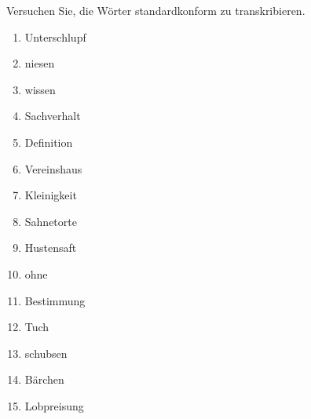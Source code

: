 \Uebung \label{u33} Versuchen Sie, die Wörter standardkonform zu transkribieren.

\begin{enumerate}\Lf
  \item Unterschlupf
  \item niesen
  \item wissen
  \item Sachverhalt
  \item Definition
  \item Vereinshaus
  \item Kleinigkeit
  \item Sahnetorte
  \item Hustensaft
  \item ohne
  \item Bestimmung
  \item Tuch
  \item schubsen
  \item Bärchen
  \item Lobpreisung
\end{enumerate}
